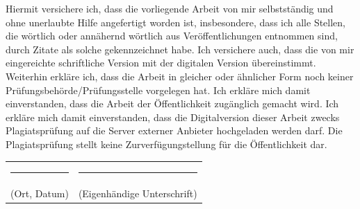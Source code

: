 \documentclass[12pt,a4paper,oneside]{book}
\begin{document}
\vspace{1em}
Hiermit versichere ich, dass die vorliegende Arbeit von mir selbstständig und ohne
unerlaubte Hilfe angefertigt worden ist, insbesondere, dass ich alle Stellen, die wörtlich
oder annähernd wörtlich aus Veröffentlichungen entnommen sind, durch Zitate als solche
gekennzeichnet habe. Ich versichere auch, dass die von mir eingereichte schriftliche Version
mit der digitalen Version übereinstimmt. Weiterhin erkläre ich, dass die Arbeit in gleicher
oder ähnlicher Form noch keiner Prüfungsbehörde/Prüfungsstelle vorgelegen hat. Ich erkläre
mich damit einverstanden, dass die Arbeit der Öffentlichkeit zugänglich gemacht wird. Ich
erkläre mich damit einverstanden, dass die Digitalversion dieser Arbeit zwecks
Plagiatsprüfung auf die Server externer Anbieter hochgeladen werden darf. Die
Plagiatsprüfung stellt keine Zurverfügungstellung für die Öffentlichkeit dar.

\vspace{3cm}
\noindent
\begin{tabular}{p{6cm}p{6cm}}
    \rule{5cm}{0.4pt} & \rule{6cm}{0.4pt}           \\[0.3cm]
    (Ort, Datum)      & (Eigenhändige Unterschrift) \\
\end{tabular}
\end{document}
